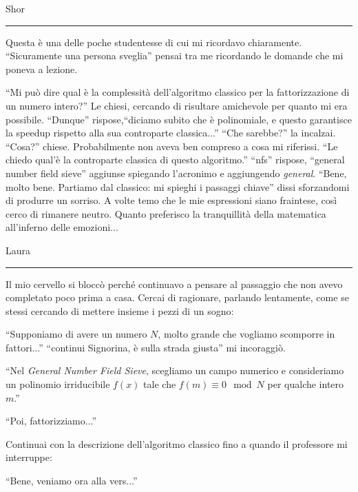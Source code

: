 \vspace{1em}
\begin{center}Shor\end{center}
\hrule
\vspace{1em}
Questa è una delle poche studentesse di cui mi ricordavo chiaramente. \enquote{Sicuramente una persona sveglia} pensai tra me ricordando le domande che mi poneva a lezione. 
\begin{dialogue}
 \enquote{Mi può dire qual è la complessità dell'algoritmo classico per la fattorizzazione di un numero intero?} Le chiesi, cercando di risultare amichevole per quanto mi era possibile.
 \enquote{Dunque} rispose,\enquote{diciamo subito che è polinomiale, e questo garantisce la speedup rispetto alla sua controparte classica...}
 \enquote{Che sarebbe?} la incalzai.
 \enquote{Cosa?} chiese. 
 Probabilmente non aveva ben compreso a cosa mi riferissi. \enquote{Le chiedo qual'è la controparte classica di questo algoritmo.}
 \enquote{nfs} rispose, \enquote{general number field sieve} aggiunse spiegando l'acronimo e aggiungendo \textit{general}.
 \enquote{Bene, molto bene. Partiamo dal classico: mi spieghi i passaggi chiave} dissi sforzandomi di produrre  un sorriso. A volte temo che le mie espressioni siano fraintese, così cerco di rimanere neutro. Quanto preferisco la tranquillità della matematica all'inferno delle emozioni...
\end{dialogue}


\vspace{1em}
\begin{center}Laura\end{center}
\hrule
\vspace{1em}
Il mio cervello si bloccò perché continuavo a pensare al passaggio che non avevo completato poco prima a casa. Cercai di ragionare, parlando lentamente, come se stessi cercando di mettere insieme i pezzi di un sogno:

\begin{dialogue}
   \enquote{Supponiamo di avere un numero $N$, molto grande che vogliamo scomporre in fattori...} 
   \enquote{continui Signorina, è sulla strada giusta} mi incoraggiò.

 \enquote{Nel \textit{General Number Field Sieve}, scegliamo un campo numerico  e consideriamo un polinomio irriducibile \( f(x) \) tale che \( f(m) \equiv 0 \mod N \) per qualche intero \( m \).}

 \enquote{Poi, fattorizziamo...}

Continuai con la descrizione dell'algoritmo classico fino a quando il professore mi interruppe:

 \enquote{Bene, veniamo ora alla vers...}
\end{dialogue}

